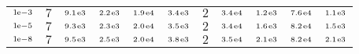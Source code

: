\begin{tiny}
\begin{tabular}{@{$\;$}c@{$\;$}|@{$\;$}c@{$\;$}@{$\;$}c@{$\;$}@{$\;$}c@{$\;$}@{$\;$}c@{$\;$}@{$\;$}c@{$\;$}|@{$\;$}c@{$\;$}@{$\;$}c@{$\;$}@{$\;$}c@{$\;$}@{$\;$}c@{$\;$}@{$\;$}c@{$\;$}}
$\scriptstyle1\!\mathrm{\hspace{0.10em}e}-3$ & $\scriptstyle7$ & $\scriptstyle9.1\mathrm{\hspace{0.10em}e}3$ & $\scriptstyle2.2\mathrm{\hspace{0.10em}e}3$ & $\scriptstyle1.9\mathrm{\hspace{0.10em}e}4$ & $\scriptstyle3.4\mathrm{\hspace{0.10em}e}3$ & $\scriptstyle2$ & $\scriptstyle3.4\mathrm{\hspace{0.10em}e}4$ & $\scriptstyle1.2\mathrm{\hspace{0.10em}e}3$ & $\scriptstyle7.6\mathrm{\hspace{0.10em}e}4$ & $\scriptstyle1.1\mathrm{\hspace{0.10em}e}3$\\ 
$\scriptstyle1\!\mathrm{\hspace{0.10em}e}-5$ & $\scriptstyle7$ & $\scriptstyle9.3\mathrm{\hspace{0.10em}e}3$ & $\scriptstyle2.3\mathrm{\hspace{0.10em}e}3$ & $\scriptstyle2.0\mathrm{\hspace{0.10em}e}4$ & $\scriptstyle3.5\mathrm{\hspace{0.10em}e}3$ & $\scriptstyle2$ & $\scriptstyle3.4\mathrm{\hspace{0.10em}e}4$ & $\scriptstyle1.6\mathrm{\hspace{0.10em}e}3$ & $\scriptstyle8.2\mathrm{\hspace{0.10em}e}4$ & $\scriptstyle1.5\mathrm{\hspace{0.10em}e}3$\\ 
$\scriptstyle1\!\mathrm{\hspace{0.10em}e}-8$ & $\scriptstyle7$ & $\scriptstyle9.5\mathrm{\hspace{0.10em}e}3$ & $\scriptstyle2.5\mathrm{\hspace{0.10em}e}3$ & $\scriptstyle2.0\mathrm{\hspace{0.10em}e}4$ & $\scriptstyle3.8\mathrm{\hspace{0.10em}e}3$ & $\scriptstyle2$ & $\scriptstyle3.5\mathrm{\hspace{0.10em}e}4$ & $\scriptstyle2.1\mathrm{\hspace{0.10em}e}3$ & $\scriptstyle8.2\mathrm{\hspace{0.10em}e}4$ & $\scriptstyle2.1\mathrm{\hspace{0.10em}e}3$\\ 
\end{tabular} 
\end{tiny} 
